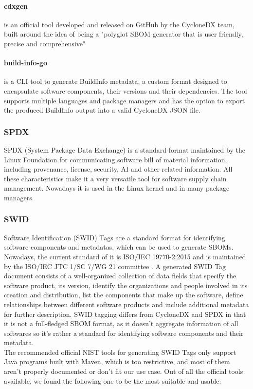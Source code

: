\paragraph{cdxgen} is an official tool developed and released on GitHub by the CycloneDX team, built around the idea of being a "polyglot SBOM generator that is user friendly, precise and comprehensive"

\paragraph{build-info-go} is a CLI tool to generate BuildInfo metadata, a custom format designed to encapsulate software components, their versions and their dependencies. The tool supports multiple languages and package managers and has the option to export the produced BuildInfo output into a valid CycloneDX JSON file.

\subsubsection{SPDX}
SPDX (System Package Data Exchange) \cite{standards:sbom:spdx} is a standard format maintained by the Linux Foundation for communicating software bill of material information, including provenance, license, security, AI and other related information. 
All these characteristics make it a very versatile tool for software supply chain management. Nowadays it is used in the Linux kernel and in many package managers.

\subsubsection{SWID}
Software Identification (SWID) Tags \cite{standards:sbom:swid} are a standard format for identifying software components and metadatas, which can be used to generate SBOMs. Nowadays, the current standard of it is ISO/IEC 19770-2:2015 \cite{standards:swid:iso19770-2:2015} and is maintained by the ISO/IEC JTC 1/SC 7/WG 21 committee \cite{standards:swid:committee}.
A generated SWID Tag document consists of a well-organized collection of data fields that specify the software product, its version, identify the organizations and people involved in its creation and distribution, list the components that make up the software, define relationships between different software products and include additional metadata for further description.
SWID tagging differs from CycloneDX and SPDX in that it is not a full-fledged SBOM format, as it doesn't aggregate information of all softwares so it's rather a standard for identifying software components and their metadata.
\\ The recommended official NIST tools for generating SWID Tags only support Java programs built with Maven, which is too restrictive, and most of them aren't properly documented or don't fit our use case. 
Out of all the official tools available, we found the following one to be the most suitable and usable:

